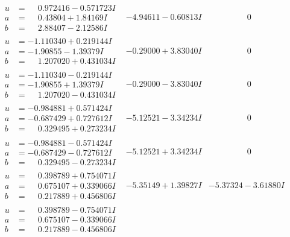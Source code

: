 \documentclass[1p]{elsarticle_modified}
\theoremstyle{definition}
\begin{document}
$$\begin{array}{c|c|c}
\begin{aligned}
u &= \phantom{-}0.972416 - 0.571723 I \\
a &= \phantom{-}0.43804 + 1.84169 I \\
b &= \phantom{-}2.88407 - 2.12586 I\end{aligned}
 & -4.94611 - 0.60813 I & \phantom{-0.000000 } 0 \\ \hline\begin{aligned}
u &= -1.110340 + 0.219144 I \\
a &= -1.90855 - 1.39379 I \\
b &= \phantom{-}1.207020 + 0.431034 I\end{aligned}
 & -0.29000 + 3.83040 I & \phantom{-0.000000 } 0 \\ \hline\begin{aligned}
u &= -1.110340 - 0.219144 I \\
a &= -1.90855 + 1.39379 I \\
b &= \phantom{-}1.207020 - 0.431034 I\end{aligned}
 & -0.29000 - 3.83040 I & \phantom{-0.000000 } 0 \\ \hline\begin{aligned}
u &= -0.984881 + 0.571424 I \\
a &= -0.687429 + 0.727612 I \\
b &= \phantom{-}0.329495 + 0.273234 I\end{aligned}
 & -5.12521 - 3.34234 I & \phantom{-0.000000 } 0 \\ \hline\begin{aligned}
u &= -0.984881 - 0.571424 I \\
a &= -0.687429 - 0.727612 I \\
b &= \phantom{-}0.329495 - 0.273234 I\end{aligned}
 & -5.12521 + 3.34234 I & \phantom{-0.000000 } 0 \\ \hline\begin{aligned}
u &= \phantom{-}0.398789 + 0.754071 I \\
a &= \phantom{-}0.675107 + 0.339066 I \\
b &= \phantom{-}0.217889 + 0.456806 I\end{aligned}
 & -5.35149 + 1.39827 I & -5.37324 - 3.61880 I \\ \hline\begin{aligned}
u &= \phantom{-}0.398789 - 0.754071 I \\
a &= \phantom{-}0.675107 - 0.339066 I \\
b &= \phantom{-}0.217889 - 0.456806 I\end{aligned}

\end{array}$$
\end{document}
